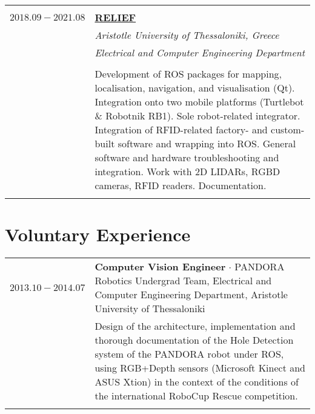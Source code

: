\documentclass[a4paper,10pt,twoside]{article}
\begin{document}
\begin{tabular}{rp{11cm}}
&\\
$2018.09 - 2021.08$ & \href{https://relief.web.auth.gr/}{\textbf{RELIEF}} \\
                    & \textit{Aristotle University of Thessaloniki, Greece}\\
                    & \textit{Electrical and Computer Engineering Department} \\
\\
                    & Development of ROS packages for mapping, localisation, navigation, and visualisation (Qt). Integration onto two mobile platforms (Turtlebot \& Robotnik RB1). Sole robot-related integrator. Integration of RFID-related factory- and custom-built software and wrapping into ROS. General software and hardware troubleshooting and integration. Work with 2D LIDARs, RGBD cameras, RFID readers. Documentation. \\
&\\
\end{tabular}


\section{Voluntary Experience}


\begin{tabular}{rp{11cm}}
  $2013.10 -2014.07$ & \textbf{Computer Vision Engineer} $\cdot$ PANDORA Robotics Undergrad Team,
Electrical and Computer Engineering Department, Aristotle University of Thessaloniki\\
& \small{Design of the architecture, implementation and thorough documentation of
the Hole Detection system of the PANDORA robot under ROS, using RGB+Depth sensors
(Microsoft Kinect and ASUS Xtion) in the context of the conditions of the international
RoboCup Rescue competition.}\\
\multicolumn{2}{c}{} \\
\end{tabular}

\vspace*{\fill}
\newpage

\end{document}
